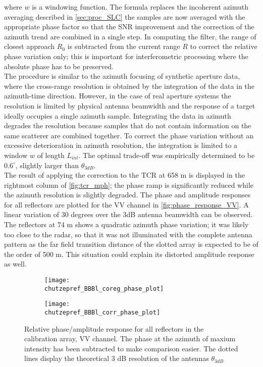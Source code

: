 where $w$ is a windowing function. The formula replaces the incoherent azimuth averaging described in \autoref{sec:proc_SLC} the samples are now averaged with the appropriate phase factor so that the SNR improvement and the correction of the azimuth trend are combined in a single step. In computing the filter, the range of closest approach $R_{0}$ is subtracted from the current range $R$ to correct the relative phase variation only; this is important for interferometric processing where the absolute phase has to be preserved.\\
The procedure is similar to the azimuth focusing of synthetic aperture data, where the cross-range resolution is obtained by the integration of the data in the azimuth-time direction. However, in the case of real aperture systems the resolution is limited by  physical antenna beamwidth and the response of a target ideally occupies a single azimuth sample. Integrating the data in azimuth degrades the resolution because samples that do not contain information on the same scatterer are combined together. To correct the phase variation without an excessive deterioration in azimuth resolution, the integration is limited to a window  $w$ of length $L_{int}$. The optimal trade-off was empirically determined to be $0.6^\circ$, slightly larger than $\theta_{3dB}$.\\
The result of applying the correction to the TCR at 658 m is displayed in the rightmost column of \autoref{fig:tcr_mph}; the phase ramp is significantly reduced while the azimuth resolution is slightly degraded.
The phase and amplitude responses for all reflectors are plotted for the VV channel in \autoref{fig:phase_response_VV}. A linear variation of 30 degrees over the 3dB antenna beamwidth can be observed. The reflectors at 74 m shows a quadratic azimuth phase variation; it was likely too close to the radar, so that it was not illuminated with the complete antenna pattern as the far field transition distance of the slotted array is expected to be of the order of 500 m. This situation could explain its distorted amplitude response as well. 
\begin{figure}[ht]
	\begin{subfigure}[t]{\columnwidth}
		\texttt{[image: \\chutzepref\_BBBl\_coreg\_phase\_plot]}
	\end{subfigure}
	\begin{subfigure}[t]{\columnwidth}
		\texttt{[image: \\chutzepref\_BBBl\_corr\_phase\_plot]}
	\end{subfigure}
	\caption{Relative phase/amplitude response for all reflectors in the calibration array, VV channel. The phase at the azimuth of maxium intensity has been subtracted to make comparison easier. The dotted lines display the theoretical 3 dB resolution of the antennas $\theta_{3dB}$}
	\label{fig:phase_response_VV}
\end{figure}
